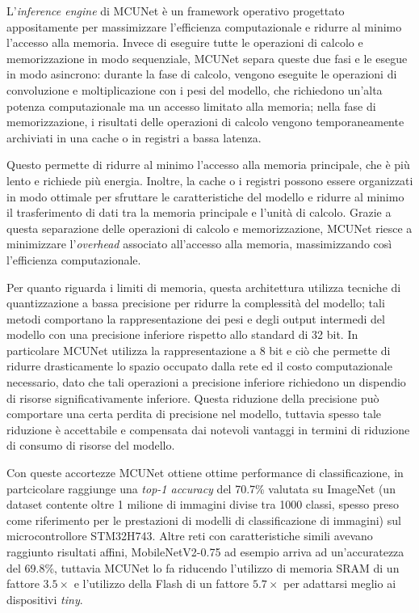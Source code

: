 L'\textit{inference engine} di MCUNet è un framework operativo progettato appositamente per massimizzare l'efficienza computazionale e ridurre al minimo l'accesso alla memoria. 
Invece di eseguire tutte le operazioni di calcolo e memorizzazione in modo sequenziale, MCUNet separa queste due fasi e le esegue in modo asincrono: durante la fase di calcolo, vengono eseguite le operazioni di convoluzione e moltiplicazione con i pesi del modello, che richiedono un'alta potenza computazionale ma un accesso limitato alla memoria;
nella fase di memorizzazione, i risultati delle operazioni di calcolo vengono temporaneamente archiviati in una cache o in registri a bassa latenza. 

Questo permette di ridurre al minimo l'accesso alla memoria principale, che è più lento e richiede più energia. Inoltre, la cache o i registri possono essere organizzati in modo ottimale per sfruttare le caratteristiche del modello e ridurre al minimo il trasferimento di dati tra la memoria principale e l'unità di calcolo.
Grazie a questa separazione delle operazioni di calcolo e memorizzazione, MCUNet riesce a minimizzare l'\textit{overhead} associato all'accesso alla memoria, massimizzando così l'efficienza computazionale.

Per quanto riguarda i limiti di memoria, questa architettura utilizza tecniche di quantizzazione a bassa precisione per ridurre la complessità del modello; tali metodi comportano la rappresentazione dei pesi e degli output intermedi del modello con una precisione inferiore rispetto allo standard di 32 bit.
In particolare MCUNet utilizza la rappresentazione a 8 bit e ciò che permette di ridurre drasticamente lo spazio occupato dalla rete ed il costo computazionale necessario, dato che tali operazioni a precisione inferiore richiedono un dispendio di risorse significativamente inferiore.
Questa riduzione della precisione può comportare una certa perdita di precisione nel modello, tuttavia spesso tale riduzione è accettabile e compensata dai notevoli vantaggi in termini di riduzione di consumo di risorse del modello. 

Con queste accortezze MCUNet ottiene ottime performance di classificazione, in partcicolare raggiunge una \textit{top-1 accuracy} del 70.7\% valutata su ImageNet (un dataset contente oltre 1 milione di immagini divise tra 1000 classi, spesso preso come riferimento per le prestazioni di modelli di classificazione di immagini) sul microcontrollore STM32H743. Altre reti con caratteristiche simili avevano raggiunto risultati affini, MobileNetV2-0.75 ad esempio arriva ad un'accuratezza del 69.8\%, tuttavia MCUNet lo fa riducendo l'utilizzo di memoria SRAM di un fattore $3.5\times$ e l'utilizzo della Flash di un fattore $5.7\times$ per adattarsi meglio ai dispositivi \textit{tiny}.

